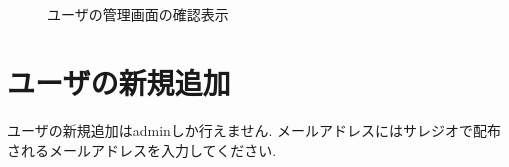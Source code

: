 \documentclass[11ptm]{jsarticle}
\begin{document}
\begin{figure}[h]
\begin{minipage}[h]{0.3\linewidth}
\begin{minipage}[h]{\linewidth}
    \end{minipage}\\
    \bigskip
    \begin{minipage}[h]{\linewidth}
      \caption{\label{fig:ユーザの管理画面の確認表示}ユーザの管理画面の確認表示}
    \end{minipage}
  \end{minipage}
\end{figure}


\clearpage


\section{ユーザの新規追加}
\label{sec:ユーザの新規追加}

ユーザの新規追加はadminしか行えません. メールアドレスにはサレジオで配布されるメールアドレスを入力してください.
\end{document}
